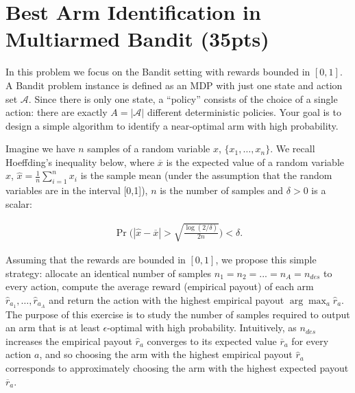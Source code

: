 \documentclass{article}
\begin{document}
 \newpage

\section{Best Arm Identification in Multiarmed Bandit (35pts)}
In this problem we focus on the Bandit setting with rewards bounded in $[0,1]$. A Bandit problem instance is defined as an MDP with just one state and action set $\mathcal A$. Since there is only one state, a ``policy'' consists of the choice of a single action: there are exactly $A = |\mathcal A|$ different deterministic policies. Your goal is to design a simple algorithm to identify a near-optimal arm with high probability.

Imagine we have $n$ samples of a random variable $x$, $\{x_1, \dots, x_n\}$. We recall Hoeffding's inequality below, where $\overline x$ is the expected value of a random variable $x$, $\widehat x= \frac{1}{n} \sum_{i=1}^n x_i$ is the sample mean (under the assumption that the random variables are in the interval [0,1]), $n$ is the number of samples  and $\delta >0$ is a scalar:

\begin{align*}
\Pr\Bigg(|\widehat x - \overline x | > \sqrt{\frac{\log(2/\delta)}{2n}}	\Bigg) < \delta.
\end{align*}

Assuming that the rewards are bounded in $[0,1]$,
we propose this simple strategy: allocate an identical number of samples $n_1 = n_2=...=n_{A} = n_{des}$ to every action, compute the average reward (empirical payout) of each arm $\widehat r_{a_1}, \dots, \widehat r_{a_A}$ and return the action with the highest empirical payout $\arg\max_a \widehat r_{a}$. The purpose of this exercise is to study the number of samples required to output an arm that is at least $\epsilon$-optimal with high probability.
Intuitively, as $n_{des}$ increases the empirical payout $\widehat r_a$ converges to its expected value $\overline r_a$ for every action $a$, and so choosing the arm with the highest empirical payout $\widehat r_a$ corresponds to approximately choosing the arm with the highest expected payout $\overline r_a$.
\end{document}
